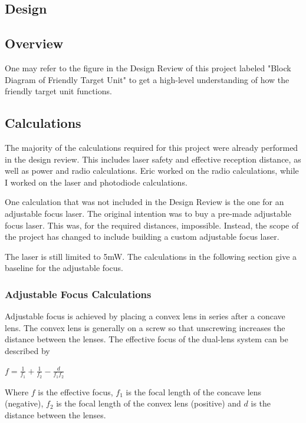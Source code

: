 \documentclass[letterpaper,10pt]{article}
\begin{document}
\begin{spacing}{1.15}
\section{Design}

\subsection{Overview} \label{section-friendly-interrogator-design}
One may refer to the figure in the Design Review of this project labeled "Block Diagram of Friendly Target Unit" to get a high-level understanding of how the friendly target unit functions. 

\subsection{Calculations}
The majority of the calculations required for this project were already performed in the design review. This includes laser safety and effective reception distance, as well as power and radio calculations. Eric worked on the radio calculations, while I worked on the laser and photodiode calculations. 

One calculation that was not included in the Design Review is the one for an adjustable focus laser. The original intention was to buy a pre-made adjustable focus laser. This was, for the required distances, impossible. Instead, the scope of the project has changed to include building a custom adjustable focus laser. 

The laser is still limited to 5mW. The calculations in the following section give a baseline for the adjustable focus. 

\subsubsection{Adjustable Focus Calculations}
Adjustable focus is achieved by placing a convex lens in series after a concave lens. The convex lens is generally on a screw so that unscrewing increases the distance between the lenses. The effective focus of the dual-lens system can be described by 

\begin{center}
	\large
	$f = \frac{1}{f_1} + \frac{1}{f_2} - \frac{d}{f_1 f_2}$
\end{center}

Where $f$ is the effective focus, $f_1$ is the focal length of the concave lens (negative), $f_2$ is the focal length of the convex lens (positive) and $d$ is the distance between the lenses. 


\end{spacing}
\end{document}
